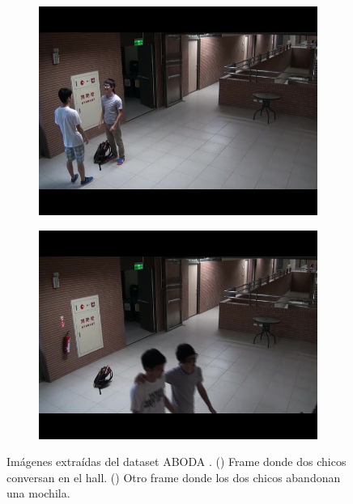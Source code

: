 \begin{figure}[ht]
  \centering
  \begin{subfigure}[b]{0.4\textwidth}
    \includegraphics[width=\textwidth]{img/chapters/resultados/datasets/aboda_1.jpg}
    \caption{}
    \label{fig:aboda_1}
  \end{subfigure}
  \qquad\qquad
  \begin{subfigure}[b]{0.4\textwidth}
    \includegraphics[width=\textwidth]{img/chapters/resultados/datasets/aboda_2.jpg}
    \caption{}
    \label{fig:aboda_2}
  \end{subfigure}
  \caption{Imágenes extraídas del dataset ABODA \cite{aboda-dataset}.
    (\protect{}) Frame donde dos chicos conversan en el hall.
    (\protect{}) Otro frame donde los dos chicos abandonan una mochila.}
  \label{fig:aboda1}
\end{figure}

